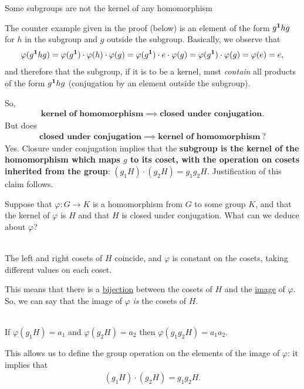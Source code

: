 \begin{theorem}
Some subgroups are not the kernel of any homomorphism
\end{theorem}

The counter example given in the proof (below) is an element of the form
$g^{\mathbf 1}hg$ for $h$ in the subgroup and $g$ outside the subgroup. Basically, we
observe that
\begin{align*}
\varphi(g^{\mathbf 1}hg) =
\varphi(g^{\mathbf 1})\cdot\varphi(h)\cdot \varphi(g) =
\varphi(g^{\mathbf 1})\cdot e\cdot\varphi(g) =
\varphi(g^{\mathbf 1})\cdot \varphi(g) =
\varphi(e) =
e,
\end{align*}
and therefore that the subgroup, if it is to be a kernel, must \emph{contain}
all products of the form $g^{\mathbf 1}hg$ (conjugation by an element outside the
subgroup).

So,
\begin{align*}
  \textbf{kernel of homomorphism} \implies \textbf{closed under conjugation}.
\end{align*}
But does
\begin{align*}
  \textbf{closed under conjugation} \implies \textbf{kernel of homomorphism} ~ ?
\end{align*}
Yes. Closure under conjugation implies that the \textbf{subgroup is the kernel
  of the homomorphism which maps $g$ to its coset, with the operation on cosets
  inherited from the group}: $(g_1H) \cdot (g_2H) = g_1g_2H$. Justification of
this claim follows.

Suppose that $\varphi:G \to K$ is a homomorphism from $G$ to some group $K$,
and that the kernel of $\varphi$ is $H$ and that $H$ is closed under
conjugation. What can we deduce about $\varphi$?

\begin{theorem}~\\
  The left and right cosets of $H$ coincide, and $\varphi$ is constant on
  the cosets, taking different values on each coset.
\end{theorem}

This means that there is a \underline{bijection} between the cosets of $H$ and
the \underline{image} of $\varphi$. So, we can say that the image of $\varphi$
\textit{is} the cosets of $H$.

\begin{theorem}~\\
  If $\varphi(g_1H) = a_1$ and $\varphi(g_2H) = a_2$ then
  $\varphi(g_1g_2H) = a_1a_2$.
\end{theorem}

This allows us to define the group operation on the elements of the image of
$\varphi$: it implies that
\begin{align*}
  (g_1H) \cdot (g_2H) = g_1g_2H.
\end{align*}

